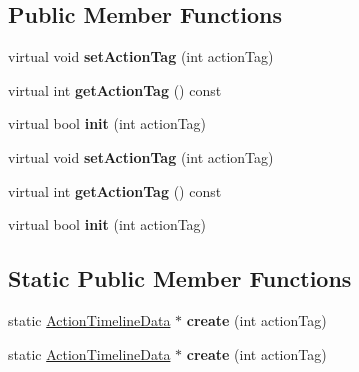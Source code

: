\subsection*{Public Member Functions}
\begin{DoxyCompactItemize}
\item 
\mbox{\label{classActionTimelineData_a1935cdc83089d90d9f49d61e3ac03797}} 
virtual void {\bfseries set\+Action\+Tag} (int action\+Tag)
\item 
\mbox{\label{classActionTimelineData_a1ea5d494b3af9720737bf7225680dd1f}} 
virtual int {\bfseries get\+Action\+Tag} () const
\item 
\mbox{\label{classActionTimelineData_a97e9f430c0715b9b5a67f3dbde65e371}} 
virtual bool {\bfseries init} (int action\+Tag)
\item 
\mbox{\label{classActionTimelineData_a1935cdc83089d90d9f49d61e3ac03797}} 
virtual void {\bfseries set\+Action\+Tag} (int action\+Tag)
\item 
\mbox{\label{classActionTimelineData_a1ea5d494b3af9720737bf7225680dd1f}} 
virtual int {\bfseries get\+Action\+Tag} () const
\item 
\mbox{\label{classActionTimelineData_a18dd85058d7c57d4d838a75577cf7566}} 
virtual bool {\bfseries init} (int action\+Tag)
\end{DoxyCompactItemize}
\subsection*{Static Public Member Functions}
\begin{DoxyCompactItemize}
\item 
\mbox{\label{classActionTimelineData_a03a4ebf7a6fa52e74834f1afc63df756}} 
static \hyperlink{classActionTimelineData}{Action\+Timeline\+Data} $\ast$ {\bfseries create} (int action\+Tag)
\item 
\mbox{\label{classActionTimelineData_ac0331538191a9f6713e99049faa49afc}} 
static \hyperlink{classActionTimelineData}{Action\+Timeline\+Data} $\ast$ {\bfseries create} (int action\+Tag)
\end{DoxyCompactItemize}

